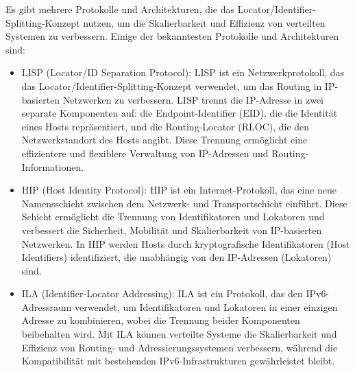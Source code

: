 \documentclass[../vs-script-first-v01.tex]{subfiles}
\begin{document}
Es gibt mehrere Protokolle und Architekturen, die das Locator/Identifier-Splitting-Konzept nutzen, um die Skalierbarkeit und Effizienz von verteilten Systemen zu verbessern. Einige der bekanntesten Protokolle und Architekturen sind:
\begin{itemize}
\item LISP (Locator/ID Separation Protocol): LISP ist ein Netzwerkprotokoll, das das Locator/Identifier-Splitting-Konzept verwendet, um das Routing in IP-basierten Netzwerken zu verbessern. LISP trennt die IP-Adresse in zwei separate Komponenten auf: die Endpoint-Identifier (EID), die die Identität eines Hosts repräsentiert, und die Routing-Locator (RLOC), die den Netzwerkstandort des Hosts angibt. Diese Trennung ermöglicht eine effizientere und flexiblere Verwaltung von IP-Adressen und Routing-Informationen.
\item HIP (Host Identity Protocol): HIP ist ein Internet-Protokoll, das eine neue Namensschicht zwischen dem Netzwerk- und Transportschicht einführt. Diese Schicht ermöglicht die Trennung von Identifikatoren und Lokatoren und verbessert die Sicherheit, Mobilität und Skalierbarkeit von IP-basierten Netzwerken. In HIP werden Hosts durch kryptografische Identifikatoren (Host Identifiers) identifiziert, die unabhängig von den IP-Adressen (Lokatoren) sind.
\item ILA (Identifier-Locator Addressing): ILA ist ein Protokoll, das den IPv6-Adressraum verwendet, um Identifikatoren und Lokatoren in einer einzigen Adresse zu kombinieren, wobei die Trennung beider Komponenten beibehalten wird. Mit ILA können verteilte Systeme die Skalierbarkeit und Effizienz von Routing- und Adressierungssystemen verbessern, während die Kompatibilität mit bestehenden IPv6-Infrastrukturen gewährleistet bleibt.
\end{itemize} 
\end{document}
